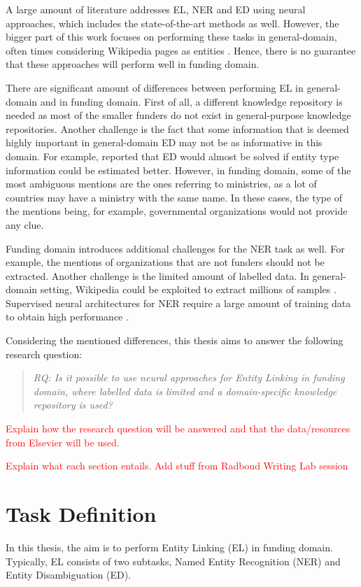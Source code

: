 \documentclass{report}
\theoremstyle{definition}
\theoremstyle{remark}
\begin{document}
A large amount of literature addresses EL, NER and ED using neural approaches, which includes the state-of-the-art methods \cite{REL,LUKE,mulang} as well. However, the bigger part of this work focuses on performing these tasks in general-domain, often times considering Wikipedia pages as entities \cite{nlpnotes}. Hence, there is no guarantee that these approaches will perform well in funding domain.

There are significant amount of differences between performing EL in general-domain and in funding domain. First of all, a different knowledge repository is needed as most of the smaller funders do not exist in general-purpose knowledge repositories.  Another challenge is the fact that some information that is deemed highly important in general-domain ED may not be as informative in this domain. For example, \cite{raiman} reported that ED would almost be solved if entity type information could be estimated better. However, in funding domain, some of the most ambiguous mentions are the ones referring to ministries, as a lot of countries may have a ministry with the same name. In these cases, the type of the mentions being, for example, governmental organizations would not provide any clue. 

Funding domain introduces additional challenges for the NER task as well. For example, the mentions of organizations that are not funders should not be extracted. Another challenge is the limited amount of labelled data. In general-domain setting, Wikipedia could be exploited to extract millions of samples \cite{bunescu-pasca-2006-using}. Supervised neural architectures for NER require a large amount of training data to obtain high performance \cite{NERsurvey}.

Considering the mentioned differences, this thesis aims to answer the following research question:

\begin{quote}\emph{RQ: Is it possible to use neural approaches for Entity Linking in funding domain, where labelled data is limited and a domain-specific knowledge repository is used?}\end{quote}

\textcolor{red}{Explain how the research question will be answered and that the data/resources from Elsevier will be used.}

\textcolor{red}{Explain what each section entails.}
\textcolor{red}{Add stuff from Radboud Writing Lab session}
\newpage
\section{Task Definition}
In this thesis, the aim is to perform Entity Linking (EL) in funding domain. Typically, EL consists of two subtasks, Named Entity Recognition (NER) and Entity Disambiguation (ED).
\end{document}
